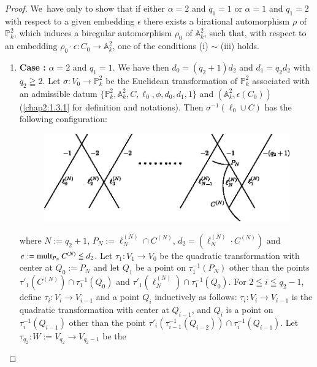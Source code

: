 \begin{proof}
We\pageoriginale\ have only to show that if either $\alpha=2$ and
$q_{1}=1$ or $\alpha=1$ and $q_{1}=2$ with respect to a given
embedding $\epsilon$ there exists a birational automorphism $\rho$ of
$\mathbb{P}^{2}_{k}$, which induces a biregular automorphism
$\rho_{0}$ of $\mathbb{A}^{2}_{k}$, such that, with respect to an
embedding $\rho_{0}\cdot\epsilon:C_{0}\to \mathbb{A}^{2}_{k}$, one of
the conditions (i) $\sim$ (iii) holds.
\begin{enumerate}
\renewcommand{\theenumi}{\Roman{enumi}}
\renewcommand{\labelenumi}{\rm(\theenumi)}
\item \textbf{Case :} $\alpha=2$ and $q_{1}=1$. We have then $d_{0}=(q_{2}+1)d_{2}$
  and $d_{1}=q_{2}d_{2}$ with $q_{2}\geqq 2$. Let $\sigma:V_{0}\to
  \mathbb{P}^{2}_{k}$ be the Euclidean transformation of
  $\mathbb{P}^{2}_{k}$ associated with an admissible datum
  $\{\mathbb{P}^{2}_{k},\mathbb{A}^{2}_{k},C,\ell_{0},\phi,d_{0},d_{1},1\}$
  and $(\mathbb{A}^{2}_{k},\epsilon(C_{0}))$ (\cf \ref{chap2:1.3.1} for
  definition and notations). Then $\sigma^{-1}(\ell_{0}\cup C)$ has
  the following configuration:
\begin{figure}[H]
\centering
\includegraphics{figures/chap2-fig7.eps}
\end{figure}
where $N:=q_{2}+1$, $P_{N}:=\ell^{(N)}_{N}\cap C^{(N)}$,
$d_{2}=(\ell^{(N)}_{N}\cdot C^{(N)})$ and
$e:=\operatorname{mult}_{P_{N}}C^{(N)}\leqq d_{2}$. Let $\tau_{1}:V_{1}\to V_{0}$ be
the quadratic transformation with center at $Q_{0}:=P_{N}$ and let
$Q_{1}$ be a point on $\tau^{-1}_{1}(P_{N})$ other than the points
$\tau'_{1}(C^{(N)})\cap \tau^{-1}_{1}(Q_{0})$ and
$\tau'_{1}(\ell^{(N)}_{N})\cap \tau^{-1}_{1}(Q_{0})$. For $2\leqq
i\leqq q_{2}-1$, define $\tau_{i}:V_{i}\to V_{i-1}$ and a point
$Q_{i}$ inductively as follows: $\tau_{i}:V_{i}\to V_{i-1}$ is the
quadratic transformation with center at $Q_{i-1}$, and $Q_{i}$ is a
point on $\tau^{-1}_{i}(Q_{i-1})$ other than the point
$\tau'_{i}(\tau^{-1}_{i-1}(Q_{i-2}))\cap \tau^{-1}_{i}(Q_{i-1})$. Let
$\tau_{q_{2}}:W:=V_{q_{2}}\to V_{q_{2}-1}$ be the\pageoriginale\

\end{enumerate}
\end{proof}
